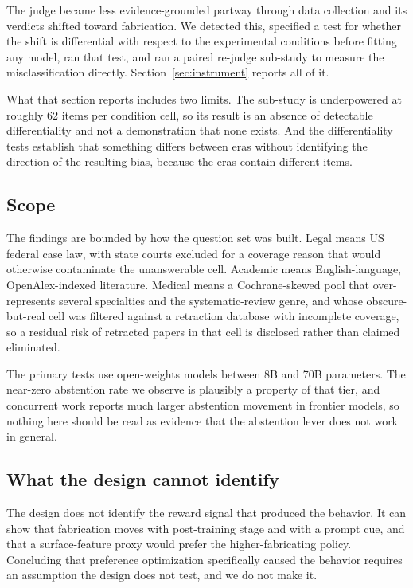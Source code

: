 The judge became less evidence-grounded partway through data collection and its
verdicts shifted toward fabrication. We detected this, specified a test for
whether the shift is differential with respect to the experimental conditions
before fitting any model, ran that test, and ran a paired re-judge sub-study to
measure the misclassification directly. Section~\ref{sec:instrument} reports all
of it.

What that section reports includes two limits. The sub-study is underpowered at
roughly 62 items per condition cell, so its result is an absence of detectable
differentiality and not a demonstration that none exists. And the
differentiality tests establish that something differs between eras without
identifying the direction of the resulting bias, because the eras contain
different items.

\subsection{Scope}

The findings are bounded by how the question set was built. Legal means US
federal case law, with state courts excluded for a coverage reason that would
otherwise contaminate the unanswerable cell. Academic means English-language,
OpenAlex-indexed literature. Medical means a Cochrane-skewed pool that
over-represents several specialties and the systematic-review genre, and whose
obscure-but-real cell was filtered against a retraction database with
incomplete coverage, so a residual risk of retracted papers in that cell is
disclosed rather than claimed eliminated.

The primary tests use open-weights models between 8B and 70B parameters. The
near-zero abstention rate we observe is plausibly a property of that tier, and
concurrent work reports much larger abstention movement in frontier models, so
nothing here should be read as evidence that the abstention lever does not work
in general.

\subsection{What the design cannot identify}

The design does not identify the reward signal that produced the behavior. It
can show that fabrication moves with post-training stage and with a prompt cue,
and that a surface-feature proxy would prefer the higher-fabricating policy.
Concluding that preference optimization specifically caused the behavior
requires an assumption the design does not test, and we do not make it.

